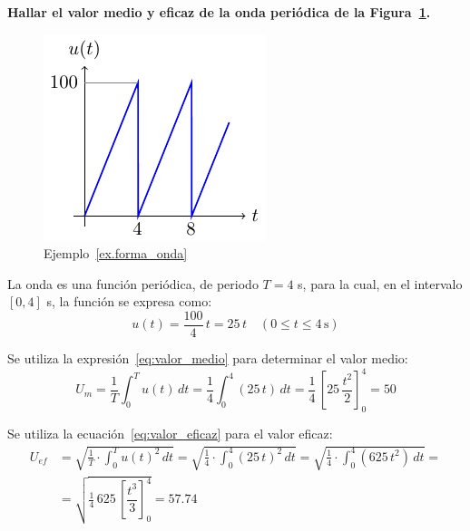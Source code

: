 \begin{example}\label{ex.forma_onda}
  \textbf{Hallar el valor medio y eficaz de la onda periódica de la
    Figura~\ref{fig:forma_onda}.}
  \begin{figure}[H]
    \centering \includegraphics{../figs/ejemplo_forma_onda.pdf}
    \caption{Ejemplo~\ref{ex.forma_onda}}
    \label{fig:forma_onda}
  \end{figure}
	    
  La onda es una función periódica, de periodo $T=4$ s, para la cual,
  en el intervalo $[0,4]$ s, la función se expresa como:
  \begin{equation*}
    u(t)=\dfrac{100}{4}\,t=25\,t\quad (0\leq t\leq 4\,\text{s})
  \end{equation*}
	    
  Se utiliza la expresión~\eqref{eq:valor_medio} para determinar el
  valor medio:
  \begin{equation*}
    U_m=\dfrac{1}{T}\int_0^T u(t)\,dt=\dfrac{1}{4}\int_0^4 (25\,t)\,dt=\dfrac{1}{4}\,\left[25\,\dfrac{t^2}{2} \right]_0^4={50}
  \end{equation*}
	    
  Se utiliza la ecuación~\eqref{eq:valor_eficaz} para el valor eficaz:
  \begin{align*}
    U_{ef}&=\sqrt{\frac{1}{T}\cdot\int_{0}^{T}u(t)^{2}\, dt}=\sqrt{\frac{1}{4}\cdot\int_{0}^{4}(25\,t)^{2}\, dt}=\sqrt{\frac{1}{4}\cdot\int_{0}^{4}(625\,t^2)\, dt}=\\
          &=\sqrt{\frac{1}{4}\, 625\,\left[\dfrac{t^3}{3}\right]_0^4}={57.74}
  \end{align*}
\end{example}
	

